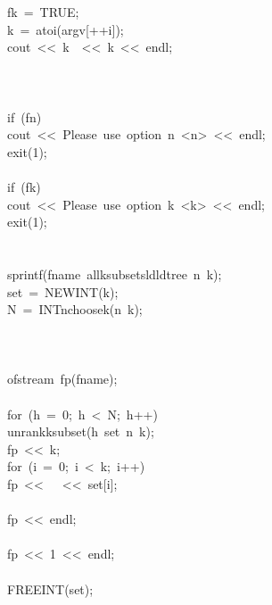 \begin{tabbing}
\>\>\>fk\ =\ TRUE;\\[0pt]
\>\>\>k\ =\ atoi(argv[++i]);\\[0pt]
\>\>\>cout\ <<\ k\ \ <<\ k\ <<\ endl;\\[0pt]
\>\>\>\\[0pt]
\>\>\\[0pt]
\\[0pt]
\>if\ (fn)\ \\[0pt]
\>\>cout\ <<\ Please\ use\ option\ n\ <n>\ <<\ endl;\\[0pt]
\>\>exit(1);\\[0pt]
\>\>\\[0pt]
\>if\ (fk)\ \\[0pt]
\>\>cout\ <<\ Please\ use\ option\ k\ <k>\ <<\ endl;\\[0pt]
\>\>exit(1);\\[0pt]
\>\>\\[0pt]
\>\\[0pt]
\>sprintf(fname\ allksubsetsldldtree\ n\ k);\\[0pt]
\>set\ =\ NEWINT(k);\\[0pt]
\>N\ =\ INTnchoosek(n\ k);\\[0pt]
\\[0pt]
\>\\[0pt]
\>\\[0pt]
\>ofstream\ fp(fname);\\[0pt]
\>\\[0pt]
\>for\ (h\ =\ 0;\ h\ <\ N;\ h++)\ \\[0pt]
\>\>unrankksubset(h\ set\ n\ k);\\[0pt]
\>\>fp\ <<\ k;\\[0pt]
\>\>for\ (i\ =\ 0;\ i\ <\ k;\ i++)\ \\[0pt]
\>\>\>fp\ <<\ \ \ <<\ set[i];\\[0pt]
\>\>\>\\[0pt]
\>\>fp\ <<\ endl;\\[0pt]
\>\>\\[0pt]
\>fp\ <<\ 1\ <<\ endl;\\[0pt]
\>\\[0pt]
\>FREEINT(set);\\[0pt]
\\[0pt]
\end{tabbing}
